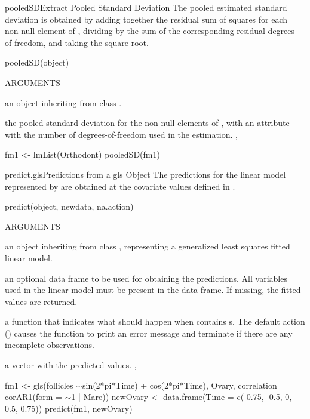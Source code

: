 \documentclass[pdftex]{article} \usepackage{url,graphicx}
\renewcommand{\Twiddle}{\mbox{\(\sim\)}}
\begin{document}
\begin{Helpfile}{pooledSD}{Extract Pooled Standard Deviation}
The pooled estimated standard deviation is obtained by adding together
the residual sum of squares for each non-null element of
, dividing by the sum of the corresponding residual
degrees-of-freedom, and taking the square-root.
\begin{Example}
pooledSD(object)
\end{Example}
\begin{Argument}{ARGUMENTS}
\item[\Co{object:}]
an object inheriting from class .
\end{Argument}
the pooled standard deviation for the non-null elements of
, with an attribute  with the number of
degrees-of-freedom used in the estimation.
, 
\need 15pt
\vspace{-16pt} 
\begin{Example}
fm1 <- lmList(Orthodont)
pooledSD(fm1)
\end{Example}
\end{Helpfile}
\begin{Helpfile}{predict.gls}{Predictions from a gls Object}
The predictions for the linear model represented by  are
obtained at the covariate values defined in .
\begin{Example}
predict(object, newdata, na.action)
\end{Example}
\begin{Argument}{ARGUMENTS}
\item[\Co{object:}]
an object inheriting from class , representing
a generalized least squares fitted linear model.
\item[\Co{newdata:}]
an optional data frame to be used for obtaining the
predictions. All variables used in the linear model must be present
in the data frame. If missing, the fitted values are returned.
\item[\Co{na.action:}]
a function that indicates what should happen when
 contains s.  The default action
() causes the function to print an error message and
terminate if there are any incomplete observations.
\end{Argument}
a vector with the predicted values.
, 
\need 15pt
\vspace{-16pt} 
\begin{Example}
fm1 <- gls(follicles \Twiddle sin(2*pi*Time) + cos(2*pi*Time), Ovary,
           correlation = corAR1(form = \Twiddle 1 | Mare))
newOvary <- data.frame(Time = c(-0.75, -0.5, 0, 0.5, 0.75))
predict(fm1, newOvary)
\end{Example}
\end{Helpfile}
\end{document}
